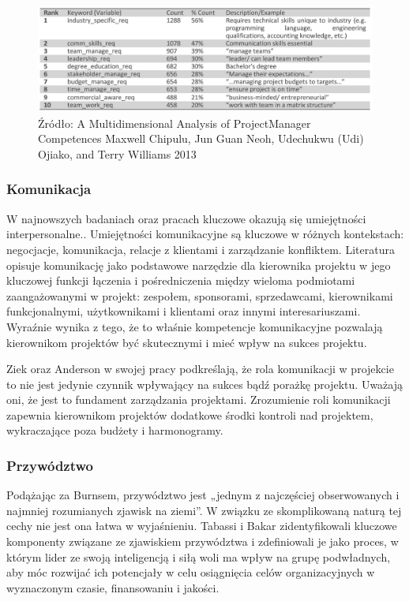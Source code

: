\begin{figure}
\centering
\includegraphics[width=14cm]{img/kompetencje2.png}
\caption{Źródło: A Multidimensional Analysis of ProjectManager Competences Maxwell Chipulu, Jun Guan Neoh, Udechukwu (Udi) Ojiako, and Terry Williams 2013}
\end{figure}

\subsubsection{Komunikacja}
W najnowszych badaniach oraz pracach kluczowe okazują się umiejętności interpersonalne.\autocite{brill}. Umiejętności komunikacyjne są kluczowe w różnych kontekstach: negocjacje, komunikacja, relacje z klientami i zarządzanie konfliktem. Literatura opisuje komunikację jako podstawowe narzędzie dla kierownika projektu w jego kluczowej funkcji łączenia i pośredniczenia między wieloma podmiotami zaangażowanymi w projekt: zespołem, sponsorami, sprzedawcami, kierownikami funkcjonalnymi, użytkownikami i klientami oraz innymi interesariuszami. Wyraźnie wynika z tego, że to właśnie kompetencje komunikacyjne pozwalają kierownikom projektów być skutecznymi i mieć wpływ na sukces projektu. \autocite{Alvarenga}

Ziek oraz Anderson w swojej pracy podkreślają, że rola komunikacji w projekcie to nie jest jedynie czynnik wpływający na sukces bądź porażkę projektu. Uważają oni, że jest to fundament zarządzania projektami. Zrozumienie roli komunikacji zapewnia kierownikom projektów dodatkowe środki kontroli nad projektem, wykraczające poza budżety i harmonogramy.\autocite{ziek}

\subsubsection{Przywództwo}
Podążając za Burnsem, przywództwo jest „jednym z najczęściej obserwowanych i najmniej rozumianych zjawisk na ziemi”\autocite{burns}. W związku ze skomplikowaną naturą tej cechy nie jest ona łatwa w wyjaśnieniu. Tabassi i Bakar zidentyfikowali kluczowe komponenty związane ze zjawiskiem przywództwa i zdefiniowali je jako proces, w którym lider ze swoją inteligencją i siłą woli ma wpływ na grupę podwładnych, aby móc rozwijać ich potencjały w celu osiągnięcia celów organizacyjnych w wyznaczonym czasie, finansowaniu i jakości.\autocite{Tabassi} 

